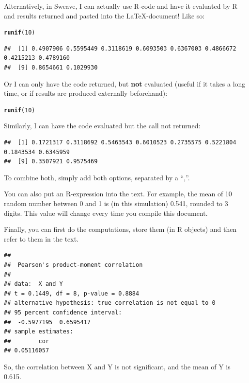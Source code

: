 \documentclass[11pt, a4paper]{article}\usepackage[]{graphicx}\usepackage[]{color}
\makeatletter
\newcommand{\hlnum}[1]{\textcolor[rgb]{0.686,0.059,0.569}{#1}}%
\newcommand{\hlstd}[1]{\textcolor[rgb]{0.345,0.345,0.345}{#1}}%
\newcommand{\hlkwd}[1]{\textcolor[rgb]{0.737,0.353,0.396}{\textbf{#1}}}%
\newenvironment{kframe}{%
 \def\at@end@of@kframe{}%
 \ifinner\ifhmode%
  \def\at@end@of@kframe{\end{minipage}}%
  \begin{minipage}{\columnwidth}%
 \fi\fi%
 \def\FrameCommand##1{\hskip\@totalleftmargin \hskip-\fboxsep
 \colorbox{shadecolor}{##1}\hskip-\fboxsep
     \hskip-\linewidth \hskip-\@totalleftmargin \hskip\columnwidth}%
 \MakeFramed {\advance\hsize-\width
   \@totalleftmargin\z@ \linewidth\hsize
   \@setminipage}}%
 {\par\unskip\endMakeFramed%
 \at@end@of@kframe}
\newenvironment{knitrout}{}{} %
\makeatother
\begin{document}
Alternatively, in Sweave, I can actually use R-code and have it evaluated by R and results returned and pasted into the \LaTeX-document! Like so:
\begin{knitrout}
\color{fgcolor}\begin{kframe}
\begin{alltt}
\hlkwd{runif}\hlstd{(}\hlnum{10}\hlstd{)}
\end{alltt}
\begin{verbatim}
##  [1] 0.4907906 0.5595449 0.3118619 0.6093503 0.6367003 0.4866672 0.4215213 0.4789160
##  [9] 0.8654661 0.1029930
\end{verbatim}
\end{kframe}
\end{knitrout}
Or I can only have the code returned, but \textbf{not} evaluated (useful if it takes a long time, or if results are produced externally beforehand):
\begin{knitrout}
\color{fgcolor}\begin{kframe}
\begin{alltt}
\hlkwd{runif}\hlstd{(}\hlnum{10}\hlstd{)}
\end{alltt}
\end{kframe}
\end{knitrout}
Similarly, I can have the code evaluated but the call not returned:
\begin{knitrout}
\color{fgcolor}\begin{kframe}
\begin{verbatim}
##  [1] 0.1721317 0.3118692 0.5463543 0.6010523 0.2735575 0.5221804 0.1843534 0.6345959
##  [9] 0.3507921 0.9575469
\end{verbatim}
\end{kframe}
\end{knitrout}
To combine both, simply add both options, separated by a ``,''.

You can also put an R-expression into the text. For example, the mean of 10 random number between 0 and 1 is (in this simulation) 0.541, rounded to 3 digits. This value will change every time you compile this document.

Finally, you can first do the computations, store them (in R objects) and then refer to them in the text.

\begin{knitrout}
\color{fgcolor}\begin{kframe}
\begin{verbatim}
## 
## 	Pearson's product-moment correlation
## 
## data:  X and Y
## t = 0.1449, df = 8, p-value = 0.8884
## alternative hypothesis: true correlation is not equal to 0
## 95 percent confidence interval:
##  -0.5977195  0.6595417
## sample estimates:
##        cor 
## 0.05116057
\end{verbatim}
\end{kframe}
\end{knitrout}
So, the correlation between X and Y is    not significant, and the mean of Y is 0.615.
\end{document}
